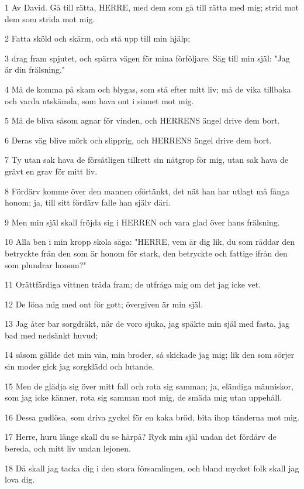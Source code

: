 \par 1 Av David. Gå till rätta, HERRE, med dem som gå till rätta med mig; strid mot dem som strida mot mig.
\par 2 Fatta sköld och skärm, och stå upp till min hjälp;
\par 3 drag fram spjutet, och spärra vägen för mina förföljare. Säg till min själ: "Jag är din frälsning."
\par 4 Må de komma på skam och blygas, som stå efter mitt liv; må de vika tillbaka och varda utskämda, som hava ont i sinnet mot mig.
\par 5 Må de bliva såsom agnar för vinden, och HERRENS ängel drive dem bort.
\par 6 Deras väg blive mörk och slipprig, och HERRENS ängel drive dem bort.
\par 7 Ty utan sak hava de försåtligen tillrett sin nätgrop för mig, utan sak hava de grävt en grav för mitt liv.
\par 8 Fördärv komme över den mannen oförtänkt, det nät han har utlagt må fånga honom; ja, till sitt fördärv falle han själv däri.
\par 9 Men min själ skall fröjda sig i HERREN och vara glad över hans frälsning.
\par 10 Alla ben i min kropp skola säga: "HERRE, vem är dig lik, du som räddar den betryckte från den som är honom för stark, den betryckte och fattige ifrån den som plundrar honom?"
\par 11 Orättfärdiga vittnen träda fram; de utfråga mig om det jag icke vet.
\par 12 De löna mig med ont för gott; övergiven är min själ.
\par 13 Jag åter bar sorgdräkt, när de voro sjuka, jag späkte min själ med fasta, jag bad med nedsänkt huvud;
\par 14 såsom gällde det min vän, min broder, så skickade jag mig; lik den som sörjer sin moder gick jag sorgklädd och lutande.
\par 15 Men de glädja sig över mitt fall och rota sig samman; ja, eländiga människor, som jag icke känner, rota sig samman mot mig, de smäda mig utan uppehåll.
\par 16 Dessa gudlösa, som driva gyckel för en kaka bröd, bita ihop tänderna mot mig.
\par 17 Herre, huru länge skall du se härpå? Ryck min själ undan det fördärv de bereda, och mitt liv undan lejonen.
\par 18 Då skall jag tacka dig i den stora församlingen, och bland mycket folk skall jag lova dig.
